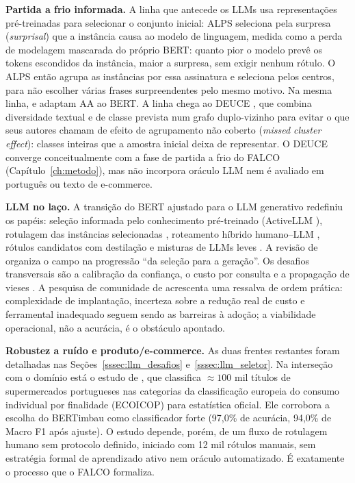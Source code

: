 \textbf{Partida a frio informada.} A linha que antecede os LLMs usa
representações pré-treinadas para selecionar o conjunto inicial: ALPS
\cite{Yuan2020} seleciona pela surpresa (\textit{surprisal}) que a instância
causa ao modelo de linguagem, medida como a perda de modelagem mascarada do
próprio BERT: quanto pior o modelo prevê os tokens escondidos da instância,
maior a surpresa, sem exigir nenhum rótulo. O ALPS então agrupa as
instâncias por essa assinatura e seleciona pelos centros, para não escolher
várias frases surpreendentes pelo mesmo motivo. Na mesma linha,
\citet{EinDor2020} e \citet{Griesshaber2020} adaptam AA ao
BERT. A linha chega ao DEUCE \cite{Guo2025Deuce}, que combina diversidade
textual e de classe prevista num grafo duplo-vizinho para evitar o que seus autores chamam de efeito
de agrupamento não coberto (\textit{missed cluster effect}): classes inteiras
que a amostra inicial deixa de representar. O DEUCE converge conceitualmente
com a fase de partida a frio do FALCO (Capítulo~\ref{ch:metodo}), mas
não incorpora oráculo LLM nem é avaliado em português ou texto de
e-commerce.

\textbf{LLM no laço.} A transição do BERT ajustado para o LLM generativo
redefiniu os papéis: seleção informada pelo conhecimento pré-treinado
(ActiveLLM \cite{Bayer2024ActiveLLM}), rotulagem das instâncias selecionadas
\cite{Zhang2025}, roteamento híbrido humano--LLM \cite{Rouzegar2024},
rótulos candidatos com destilação \cite{Xia2025CanDist} e misturas de LLMs
leves \cite{Qi2026MixtureLLMs}. A revisão de \citet{Xia2025} organiza o campo
na progressão ``da seleção para a geração''. Os desafios transversais são a
calibração da confiança, o custo por consulta e a propagação de vieses
\cite{Bayer2024ActiveLLM, Zhang2025}. A pesquisa de comunidade de
\citet{Romberg2025Reassessing} acrescenta uma ressalva de ordem prática: complexidade de
implantação, incerteza sobre a redução real de custo e ferramental inadequado
seguem sendo as barreiras à adoção; a viabilidade operacional, não a
acurácia, é o obstáculo apontado.

\textbf{Robustez a ruído e produto/e-commerce.} As duas frentes restantes
foram detalhadas nas Seções~\ref{sssec:llm_desafios}
e~\ref{sssec:llm_seletor}. Na interseção com o domínio está o estudo de
\citet{Machado2026RetailPt}, que classifica $\approx 100$ mil títulos de
supermercados portugueses nas categorias da classificação europeia do consumo
individual por finalidade (ECOICOP) para estatística oficial. Ele corrobora a
escolha do BERTimbau como classificador forte (97,0\% de acurácia, 94,0\% de
Macro F1 após ajuste). O estudo depende, porém, de um
fluxo de rotulagem humano sem protocolo definido, iniciado com 12 mil rótulos
manuais, sem estratégia formal de aprendizado ativo nem oráculo automatizado.
É exatamente o processo que o FALCO formaliza.

